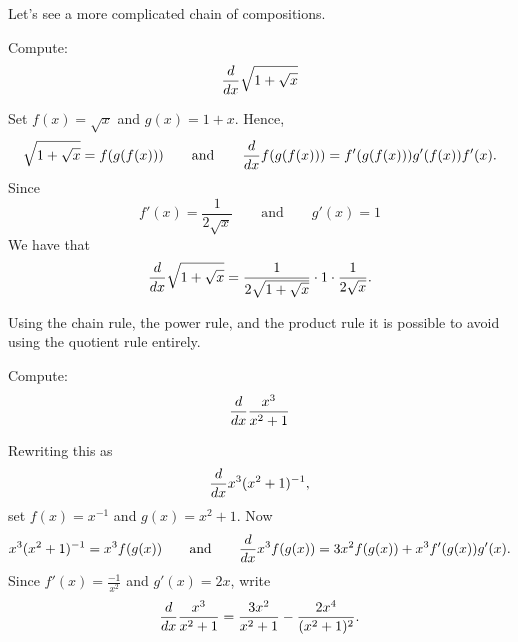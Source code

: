 Let's see a more complicated chain of compositions.

\begin{example}
Compute:
\[
\frac{d}{dx} \sqrt{1+\sqrt{x}}
\]
\end{example}

\begin{solution}
Set 
$f(x)=\sqrt{x}$ and $g(x)=1+x$. Hence,
\[
\sqrt{1+\sqrt{x}}=f(g(f(x))) \qquad\text{and}\qquad\frac{d}{dx} f(g(f(x))) = f'(g(f(x)))g'(f(x))f'(x).
\]
Since 
\[
f'(x) = \frac{1}{2\sqrt{x}} \qquad\text{and}\qquad g'(x) = 1
\]
We have that
\[
\frac{d}{dx} \sqrt{1+\sqrt{x}} = \frac{1}{2\sqrt{1+\sqrt{x}}}\cdot 1\cdot  \frac{1}{2\sqrt{x}}.
\]
\end{solution}

Using the chain rule, the power rule, and the product rule it is
possible to avoid using the quotient rule entirely.

\begin{example}
Compute:
\[
\frac{d}{dx} \frac{x^3}{x^2+1}
\]
\end{example}
\begin{solution}
Rewriting this as 
\[
\frac{d}{dx} x^3(x^2+1)^{-1}, 
\]
set $f(x) = x^{-1}$ and $g(x) = x^2+1$. Now
\[
x^3(x^2+1)^{-1} = x^3 f(g(x)) \qquad\text{and}\qquad \frac{d}{dx} x^3 f(g(x)) = 3x^2f(g(x))+ x^3 f'(g(x))g'(x).
\]
Since $f'(x) = \frac{-1}{x^2}$ and $g'(x) = 2x$, write
\[
\frac{d}{dx} \frac{x^3}{x^2+1} = \frac{3x^2}{x^2+1}-\frac{2x^4}{(x^2+1)^2}.
\]
\end{solution}


